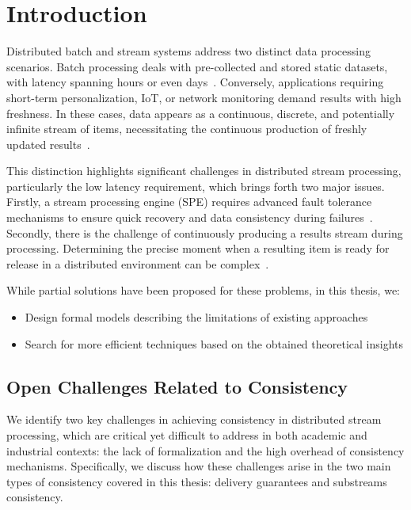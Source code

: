 \chapter{Introduction}

Distributed batch and stream systems address two distinct data processing scenarios. Batch processing deals with pre-collected and stored static datasets, with latency spanning hours or even days~\cite{carbone2015apache, chang2014hawq, sun2023survey}. Conversely, applications requiring short-term personalization, IoT, or network monitoring demand results with high freshness. In these cases, data appears as a continuous, discrete, and potentially infinite stream of items, necessitating the continuous production of freshly updated results~\cite{fragkoulis2024survey, diro2024anomaly}.

This distinction highlights significant challenges in distributed stream processing, particularly the low latency requirement, which brings forth two major issues. Firstly, a stream processing engine (SPE) requires advanced fault tolerance mechanisms to ensure quick recovery and data consistency during failures~\cite{Wang:2019:LSF:3341301.3359653, akidau2015streaming}. Secondly, there is the challenge of continuously producing a results stream during processing. Determining the precise moment when a resulting item is ready for release in a distributed environment can be complex~\cite{Tucker:2003:EPS:776752.776780, DBLP:journals/pvldb/BegoliACHKKMS21}.

While partial solutions have been proposed for these problems, in this thesis, we: 
\begin{itemize}
    \item Design formal models describing the limitations of existing approaches
    \item Search for more efficient techniques based on the obtained theoretical insights
\end{itemize}

\section{Open Challenges Related to Consistency}

We identify two key challenges in achieving consistency in distributed stream processing, which are critical yet difficult to address in both academic and industrial contexts: the lack of formalization and the high overhead of consistency mechanisms. Specifically, we discuss how these challenges arise in the two main types of consistency covered in this thesis: delivery guarantees and substreams consistency.

